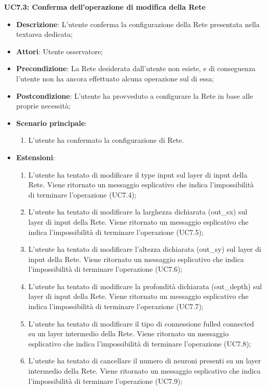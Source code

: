 \textbf{UC7.3: Conferma dell'operazione di modifica della Rete}
\label{UC7.3: Conferma dell'operazione di modifica della Rete}
\noindent
\begin{itemize}
\item \textbf{Descrizione}: L'utente conferma la configurazione della Rete presentata nella textarea dedicata;
\item \textbf{Attori}: Utente osservatore;
\item \textbf{Precondizione}: La Rete desiderata dall'utente non esiste, e di conseguenza l'utente non ha ancora effettuato alcuna operazione sul di essa;
\item \textbf{Postcondizione}: L'utente ha provveduto a configurare la Rete in base alle proprie necessit\`a;
\item \textbf{Scenario principale}:
\begin{enumerate}
\item L'utente ha confermato la configurazione di Rete.
\end{enumerate}
\item \textbf{Estensioni}:
\begin{enumerate}
\item L'utente ha tentato di modificare il type input sul layer di input della Rete. Viene ritornato un messaggio esplicativo che indica l'impossibilit\`a di terminare l'operazione (UC7.4);
\item L'utente ha tentato di modificare la larghezza dichiarata (out\_sx) sul layer di input della Rete. Viene ritornato un messaggio esplicativo che indica l'impossibilit\`a di terminare l'operazione (UC7.5);
\item L'utente ha tentato di modificare l'altezza dichiarata (out\_sy) sul layer di input della Rete. Viene ritornato un messaggio esplicativo che indica l'impossibilit\`a di terminare l'operazione (UC7.6);
\item L'utente ha tentato di modificare la profondit\`a dichiarata (out\_depth) sul layer di input della Rete. Viene ritornato un messaggio esplicativo che indica l'impossibilit\`a di terminare l'operazione (UC7.7);
\item L'utente ha tentato di modificare il tipo di connessione fulled connected su un layer intermedio della Rete. Viene ritornato un messaggio esplicativo che indica l'impossibilit\`a di terminare l'operazione (UC7.8);
\item L'utente ha tentato di cancellare il numero di neuroni presenti su un layer intermedio della Rete. Viene ritornato un messaggio esplicativo che indica l'impossibilit\`a di terminare l'operazione (UC7.9);

\end{enumerate}
\end{itemize}
